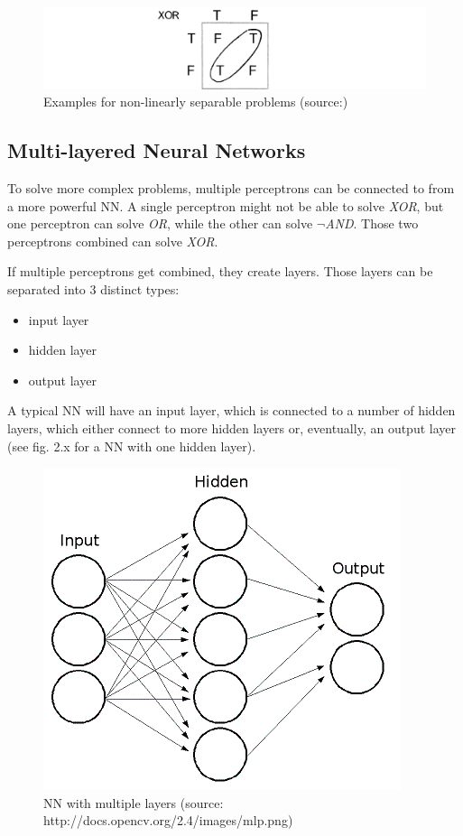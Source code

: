 \begin{figure}[H]
	\begin{center}
		\includegraphics[scale=0.75]{img/nlsp.png}
		\caption{Examples for non-linearly separable problems (source:\cite{Shiffman12})}
		\label{fig:fig2.8}
	\end{center}
\end{figure}


\subsection{Multi-layered Neural Networks}
To solve more complex problems, multiple perceptrons can be connected to from a more powerful NN. A single perceptron might not be able to solve \emph{XOR}, but one perceptron can solve \emph{OR}, while the other can solve \emph{$\neg$AND}. Those two perceptrons combined can solve \emph{XOR}\cite{Shiffman12}.

If multiple perceptrons get combined, they create layers. Those layers can be separated into 3 distinct types\cite{Stergiou96}:
\begin{itemize}
	\item input layer
	\item hidden layer
	\item output layer
\end{itemize}

A typical NN will have an input layer, which is connected to a number of hidden layers, which either connect to more hidden layers or, eventually, an output layer (see fig. 2.x for a NN with one hidden layer).

\begin{figure}[H]
	\begin{center}
		\includegraphics[scale=0.8]{img/mlp.png}
		\caption{NN with multiple layers (source: http://docs.opencv.org/2.4/\textunderscore images/mlp.png)}
		\label{fig:fig2.2}
	\end{center}
\end{figure}

